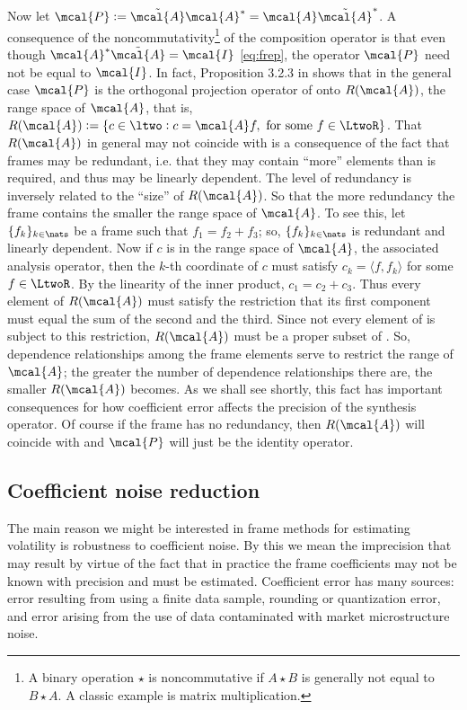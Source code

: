 \documentclass[a4paper, 12pt]{article}
\newcommand{\inner}[2]{\ensuremath{\langle{#1},{#2}\rangle}\xspace}
\newcommand{\ap}{\ensuremath{\mcal{A}}\xspace}
\begin{document}
Now let $\mcal{P}:= \tilde{\mcal{A}}\mcal{A}^*  = \mcal{A}\tilde{\mcal{A}}^*$. A consequence of the noncommutativity\footnote{A binary operation $\star$ is noncommutative if $A\star B$ is generally not equal to $B\star A$. A classic  example is matrix multiplication.}   of the composition operator is that even though $\mcal{A}^*\tilde{\mcal{A}} = \mcal{I}$  \eqref{eq:frep}, the operator $\mcal{P}$   need not be equal to $\mcal{I}$. In fact, Proposition 3.2.3 in \citep{Daubechies1992} shows that in the general case $\mcal{P}$ is the orthogonal projection operator of \ltwo onto $R(\ap)$, the range space of $\mcal{A}$, that is, {$R(\mcal{A}) := \{c \in \ltwo : c = \mcal{A} f, \text{ for some } f \in \LtwoR\}$}.   That $R(\mcal{A})$ in general may not coincide  with \ltwo is a consequence of the fact that  frames  may be redundant, i.e.  that they may contain ``more'' elements than is required, and thus may be linearly dependent. The level of redundancy is inversely related to the ``size'' of  $R(\mcal{A})$. So that the more redundancy the frame contains the smaller the range space of \ap. To see this, let $\{f_k\}_{k \in \nats}$ be a  frame  such that $f_1 = f_2 + f_3$; so, $\{f_k\}_{k \in \nats}$ is redundant and  linearly dependent. Now if $c$ is in the range space of \ap, the associated analysis operator, then  the $k$-th coordinate of $c$ must satisfy $c_k = \inner{f}{f_k}$  for some $f \in \LtwoR$.  By the linearity of the inner product, $c_1 = c_2 + c_3$. Thus every element of $R(\ap)$ must satisfy the restriction that its first component must equal the sum of the second and the third. Since not every element of  \ltwo is subject to this restriction, $R(\ap)$ must be a proper subset of \ltwo. So, dependence relationships among the frame elements serve to restrict the range of \ap; the greater the number of dependence relationships there are, the smaller $R(\ap)$ becomes.   As we shall see shortly, this fact has important consequences for how coefficient error affects the precision of the synthesis operator. Of course if the frame has no redundancy, then $R(\mcal{A})$   will coincide with \ltwo and $\mcal{P}$ will just be the identity operator. 
\subsection{Coefficient noise reduction}\label{sub:why}
The main reason we might be interested in frame methods for estimating volatility is robustness to coefficient noise. By this we mean the imprecision that may result by virtue of the fact that in practice the frame coefficients may not be known with precision and must be estimated. Coefficient error has many sources: error resulting from using a finite data sample, rounding or quantization error,  and error arising from the use of data contaminated with market microstructure noise. 
\end{document}
